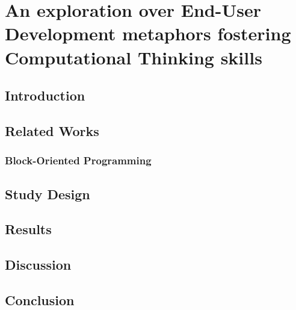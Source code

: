 %
\chapter{An exploration over End-User Development metaphors fostering Computational Thinking skills}
\label{sec:exploration}

\section{Introduction}

\section{Related Works}

\subsection{Block-Oriented Programming}

\section{Study Design}

\section{Results}

\section{Discussion}

\section{Conclusion}